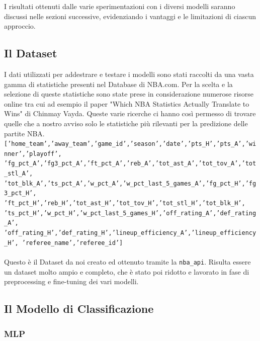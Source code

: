 I risultati ottenuti dalle varie sperimentazioni con i diversi modelli saranno discussi nelle sezioni successive, evidenziando i vantaggi e le limitazioni di ciascun approccio.

\subsection{Il Dataset}

I dati utilizzati per addestrare e testare i modelli sono stati raccolti da una vasta gamma di statistiche presenti nel Database di NBA.com. Per la scelta e la selezione di queste statistiche sono state prese in considerazione numerose risorse online tra cui ad esempio il paper "Which NBA Statistics Actually Translate to Wins" di Chinmay Vayda. Queste varie ricerche ci hanno così permesso di trovare quelle che a nostro avviso solo le statistiche più rilevanti per la predizione delle partite NBA.\newline
\newline
\texttt{['home\_team','away\_team','game\_id','season','date','pts\_H','pts\_A','winner','playoff', \newline
'fg\_pct\_A','fg3\_pct\_A','ft\_pct\_A','reb\_A','tot\_ast\_A','tot\_tov\_A','tot\_stl\_A',\newline
'tot\_blk\_A','ts\_pct\_A','w\_pct\_A','w\_pct\_last\_5\_games\_A','fg\_pct\_H','fg3\_pct\_H',\newline
'ft\_pct\_H','reb\_H','tot\_ast\_H','tot\_tov\_H','tot\_stl\_H','tot\_blk\_H', \newline
'ts\_pct\_H','w\_pct\_H','w\_pct\_last\_5\_games\_H','off\_rating\_A','def\_rating\_A',\newline
'off\_rating\_H','def\_rating\_H','lineup\_efficiency\_A','lineup\_efficiency\_H',\newline
'referee\_name','referee\_id']}\\
\\
Questo è il Dataset da noi creato ed ottenuto tramite la \texttt{nba\_api}. Risulta essere un dataset molto ampio e completo, che è stato poi ridotto e lavorato in fase di preprocessing e fine-tuning dei vari modelli.

\subsection{Il Modello di Classificazione}

\subsubsection{MLP}

